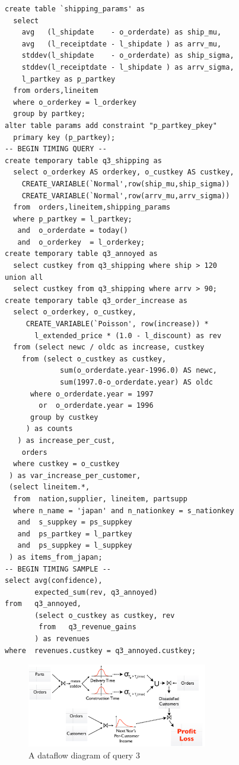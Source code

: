 

\begin{footnotesize}
\begin{verbatim}
create table `shipping_params' as
  select 
    avg   (l_shipdate    - o_orderdate) as ship_mu,
    avg   (l_receiptdate - l_shipdate ) as arrv_mu,
    stddev(l_shipdate    - o_orderdate) as ship_sigma,
    stddev(l_receiptdate - l_shipdate ) as arrv_sigma,
    l_partkey as p_partkey
  from orders,lineitem
  where o_orderkey = l_orderkey
  group by partkey;
alter table params add constraint "p_partkey_pkey" 
  primary key (p_partkey);
-- BEGIN TIMING QUERY --
create temporary table q3_shipping as
  select o_orderkey AS orderkey, o_custkey AS custkey,
    CREATE_VARIABLE(`Normal',row(ship_mu,ship_sigma))
    CREATE_VARIABLE(`Normal',row(arrv_mu,arrv_sigma))
  from  orders,lineitem,shipping_params
  where p_partkey = l_partkey;
   and  o_orderdate = today()
   and  o_orderkey  = l_orderkey;
create temporary table q3_annoyed as
  select custkey from q3_shipping where ship > 120
union all
  select custkey from q3_shipping where arrv > 90;
create temporary table q3_order_increase as
  select o_orderkey, o_custkey,
     CREATE_VARIABLE(`Poisson', row(increase)) *
       l_extended_price * (1.0 - l_discount) as rev
  from (select newc / oldc as increase, custkey 
    from (select o_custkey as custkey, 
             sum(o_orderdate.year-1996.0) AS newc,
             sum(1997.0-o_orderdate.year) AS oldc
      where o_orderdate.year = 1997 
        or  o_orderdate.year = 1996
      group by custkey
     ) as counts
   ) as increase_per_cust,
    orders
  where custkey = o_custkey
 ) as var_increase_per_customer,
 (select lineitem.*,
  from  nation,supplier, lineitem, partsupp
  where n_name = 'japan' and n_nationkey = s_nationkey
   and  s_suppkey = ps_suppkey
   and  ps_partkey = l_partkey
   and  ps_suppkey = l_suppkey
 ) as items_from_japan;
-- BEGIN TIMING SAMPLE --
select avg(confidence),
       expected_sum(rev, q3_annoyed)
from   q3_annoyed,
       (select o_custkey as custkey, rev
        from   q3_revenue_gains
       ) as revenues
where  revenues.custkey = q3_annoyed.custkey;
\end{verbatim}
\end{footnotesize}

\begin{figure}
\begin{center}
\includegraphics[width=3.1in]{graphics/query3.pdf}
\caption{A dataflow diagram of query 3}
\label{fig:query3dataflow}
\end{center}
\end{figure}

